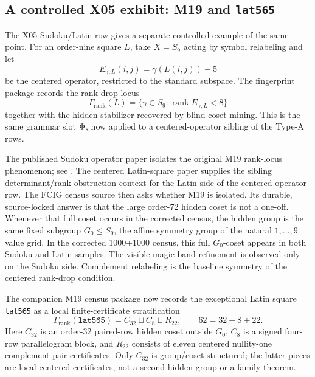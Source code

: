 \subsection{A controlled X05 exhibit: M19 and \texttt{lat565}}

The X05 Sudoku/Latin row gives a separate controlled example of the same point.  For an order-nine square \(L\), take \(X=S_9\) acting by symbol relabeling and let
\[
  E_{\gamma,L}(i,j)=\gamma(L(i,j))-5
\]
be the centered operator, restricted to the standard subspace.  The fingerprint package records the rank-drop locus
\[
  \Gamma_{\mathrm{rank}}(L)=\{\gamma\in S_9:\operatorname{rank}E_{\gamma,L}<8\}
\]
together with the hidden stabilizer recovered by blind coset mining.  This is the same grammar slot \(\Phi\), now applied to a centered-operator sibling of the Type-A rows.

The published Sudoku operator paper isolates the original M19 rank-locus phenomenon; see \cite{BabanskyySudokuOperators2026}.  The centered Latin-square paper supplies the sibling determinant/rank-obstruction context for the Latin side of the centered-operator row\cite{BabanskyyLatin2026}.  The FCIG census source then asks whether M19 is isolated.  Its durable, source-locked answer is that the large order-72 hidden coset is not a one-off.  Whenever that full coset occurs in the corrected census, the hidden group is the same fixed subgroup \(G_0\leq S_9\), the affine symmetry group of the natural \(1,\ldots,9\) value grid.  In the corrected 1000+1000 census, this full \(G_0\)-coset appears in both Sudoku and Latin samples.  The visible magic-band refinement is observed only on the Sudoku side.  Complement relabeling is the baseline symmetry of the centered rank-drop condition.

The companion M19 census package now records the exceptional Latin square \texttt{lat565} as a local finite-certificate stratification
\[
  \Gamma_{\mathrm{rank}}(\texttt{lat565})=C_{32}\sqcup C_8\sqcup R_{22},\qquad 62=32+8+22.
\]
Here \(C_{32}\) is an order-32 paired-row hidden coset outside \(G_0\), \(C_8\) is a signed four-row parallelogram block, and \(R_{22}\) consists of eleven centered nullity-one complement-pair certificates.  Only \(C_{32}\) is group/coset-structured; the latter pieces are local centered certificates, not a second hidden group or a family theorem.

